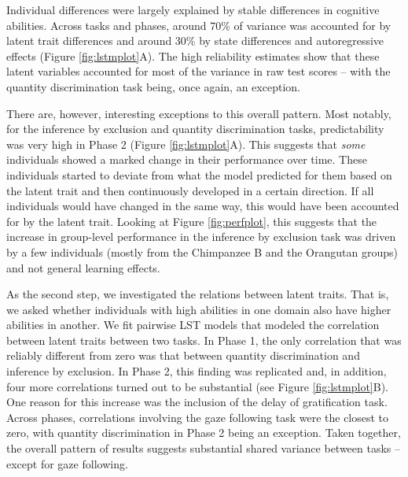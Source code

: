 \documentclass[
  man,floatsintext]{apa6}
\begin{document}
Individual differences were largely explained by stable differences in cognitive abilities. Across tasks and phases, around 70\% of variance was accounted for by latent trait differences and around 30\% by state differences and autoregressive effects (Figure \ref{fig:lstmplot}A). The high reliability estimates show that these latent variables accounted for most of the variance in raw test scores -- with the quantity discrimination task being, once again, an exception.

There are, however, interesting exceptions to this overall pattern. Most notably, for the inference by exclusion and quantity discrimination tasks, predictability was very high in Phase 2 (Figure \ref{fig:lstmplot}A). This suggests that \emph{some} individuals showed a marked change in their performance over time. These individuals started to deviate from what the model predicted for them based on the latent trait and then continuously developed in a certain direction. If all individuals would have changed in the same way, this would have been accounted for by the latent trait. Looking at Figure \ref{fig:perfplot}, this suggests that the increase in group-level performance in the inference by exclusion task was driven by a few individuals (mostly from the Chimpanzee B and the Orangutan groups) and not general learning effects.

As the second step, we investigated the relations between latent traits. That is, we asked whether individuals with high abilities in one domain also have higher abilities in another. We fit pairwise LST models that modeled the correlation between latent traits between two tasks. In Phase 1, the only correlation that was reliably different from zero was that between quantity discrimination and inference by exclusion. In Phase 2, this finding was replicated and, in addition, four more correlations turned out to be substantial (see Figure \ref{fig:lstmplot}B). One reason for this increase was the inclusion of the delay of gratification task. Across phases, correlations involving the gaze following task were the closest to zero, with quantity discrimination in Phase 2 being an exception. Taken together, the overall pattern of results suggests substantial shared variance between tasks -- except for gaze following.
\end{document}

